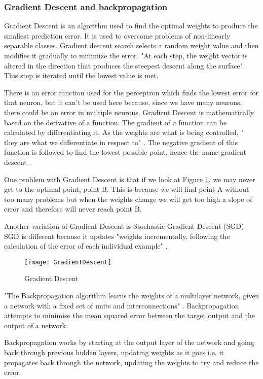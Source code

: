 \tocless\subsubsection{Gradient Descent and backpropagation}
Gradient Descent is an algorithm used to find the optimal weights to produce the
smallest prediction error. It is used to overcome problems of non-linearly
separable classes. Gradient descent search selects a random weight value and
then modifies it gradually to minimize the error. "At each step, the weight
vector is altered in the direction that produces the steepest descent along the
surface" \parencite{MLANN}. This step is iterated until the lowest value is met.

There is an error function used for the perceptron which finds the lowest error for that neuron, but it can't be used here because, since we have many neurons, there could be an error in multiple neurons.
Gradient Descent is mathematically based on the derivative of a function.
The gradient of a function can be calculated by differentiating it.
As the weights are what is being controlled, " they are what we differentiate in respect to" \parencite{MLAlgorithm}.
The negative gradient of this function is followed to find the lowest possible point, hence the name gradient descent \parencite{MLAlgorithm}.

One problem with Gradient Descent is that if we look at Figure \ref{fig:GD}, we may
never get to the optimal point, point B. This is because we will find point A
without too many problems but when the weights change we will get too high a
slope of error and therefore will never reach point B.

Another variation of Gradient Descent is Stochastic Gradient Descent (SGD). SGD
is different because it updates "weights incrementally, following the
calculation of the error of each individual example" \parencite{MLANN}. 

\begin{figure}[h]
      \texttt{[image: GradientDescent]}
      \caption{Gradient Descent}
      \label{fig:GD}
 \end{figure}

"The Backpropagation algorithm learns the weights of a multilayer network,
given a network with a fixed set of units and interconnections" \parencite{MLANN}.
Backpropagation attempts to minimise the mean squared error between the target
output and the output of a network.

Backpropagation works by starting at the output layer of the network and going
back through previous hidden layers, updating weights as it goes i.e. it propagates back through the network, updating the weights to try and reduce the error.

